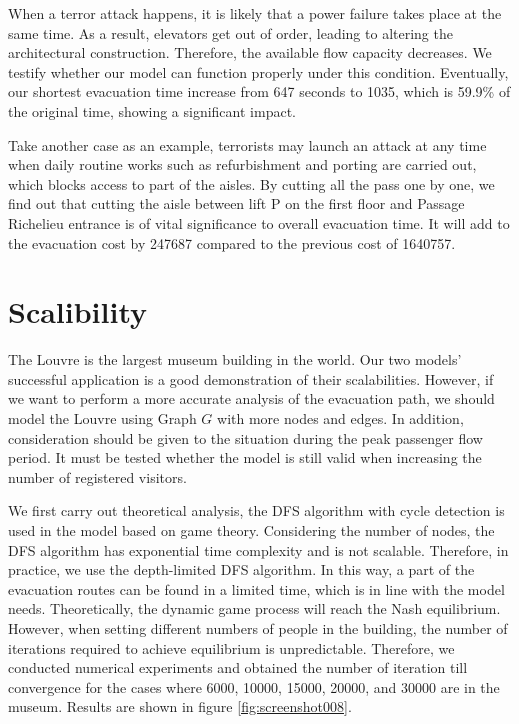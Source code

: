 \documentclass{mcmthesis}
\begin{document}
	When a terror attack happens, it is likely that a power failure takes place at the same time. As a result, elevators get out of order, leading to altering the architectural construction. Therefore, the available flow capacity decreases. We testify whether our model can function properly under this condition. Eventually, our shortest evacuation time increase from 647 seconds to 1035, which is 59.9\% of the original time, showing a significant impact.
	
	Take another case as an example,  terrorists may launch an attack at any time when daily routine works such as refurbishment and porting are carried out, which blocks access to part of the aisles. By cutting all the pass one by one, we find out that cutting the aisle between lift P on the first floor and Passage Richelieu entrance is of vital significance to overall evacuation time. It will add to the evacuation cost by 247687 compared to the previous cost of 1640757.
	
	\section {Scalibility}
	The Louvre is the largest museum building in the world. Our two models' successful application is a good demonstration of their scalabilities. However, if we want to perform a more accurate analysis of the evacuation path, we should model the Louvre using Graph $G$ with more nodes and edges. In addition, consideration should be given to the situation during the peak passenger flow period.  It must be tested whether the model is still valid when increasing the number of registered visitors.
	
	We first carry out theoretical analysis,  the DFS algorithm with cycle detection is used in the model based on game theory. Considering the number of nodes, the DFS algorithm has exponential time complexity and is not scalable. Therefore, in practice, we use the depth-limited DFS algorithm. In this way, a part of the  evacuation routes can be found in a limited time, which is in line with the model needs.
	Theoretically, the dynamic game process will reach the Nash equilibrium. However, when setting different numbers of people in the building, the number of iterations required to achieve equilibrium is unpredictable. Therefore, we conducted numerical experiments and obtained the number of iteration till convergence for the cases where 6000, 10000, 15000, 20000, and 30000 are in the museum. Results are shown in figure \ref{fig:screenshot008}.
	
\end{document}
